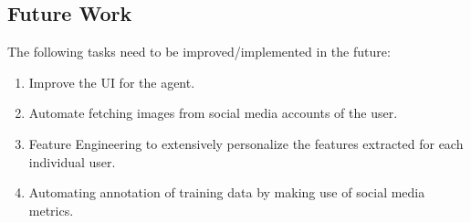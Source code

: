 \subsection{Future Work}
The following tasks need to be improved/implemented in the future:
\begin{enumerate}
\item Improve the UI for the agent.
\item Automate fetching images from social media accounts of the user.
\item Feature Engineering to extensively personalize the features extracted for each individual user.
\item Automating annotation of training data by making use of social media metrics.
\end{enumerate}

 





